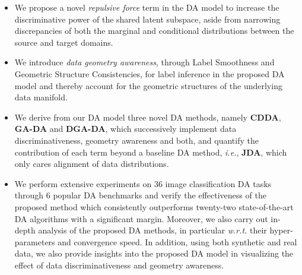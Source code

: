 \documentclass[journal,twocolumn]{IEEEtran}
\newcommand\luo[1]{{\footnotesize \color{blue}[#1 - \textbf{Luo}]}}
\begin{document}
\begin{CJK*}{UTF8}{gkai}
\begin{itemize}
	\item We propose a novel \textit{repulsive force} term in the DA model  to increase the discriminative power of the shared latent subspace, aside from narrowing discrepancies of both the marginal and conditional distributions between the source and target domains. 
    
    	\item We introduce \textit{data geometry awareness}, through Label Smoothness  and Geometric Structure Consistencies, for label inference  in the proposed DA model and thereby account for the geometric structures of the underlying data manifold.   
	

	\item We derive from our DA model three novel DA methods, namely \textbf{CDDA}, \textbf{GA-DA} and \textbf{DGA-DA}, which successively implement data discriminativeness, geometry awareness  and both, and quantify the contribution of each term beyond a baseline DA method,\textit{ i.e.}, \textbf{JDA}, which only cares alignment of data distributions. 
	
	\item We perform extensive experiments on 36 image classification DA tasks through 6 popular DA benchmarks and verify the effectiveness of the proposed method which consistently outperforms twenty-two state-of-the-art DA algorithms with a significant margin. Moreover, we also carry out in-depth analysis of the proposed DA methods, in particular \textit{w.r.t.} their hyper-parameters and convergence speed. In addition, using both synthetic and real data, we also provide insights into the proposed DA model in visualizing the effect of data discriminativeness and geometry awareness. 
   
	 
\end{itemize}


\end{CJK*}
\end{document}

